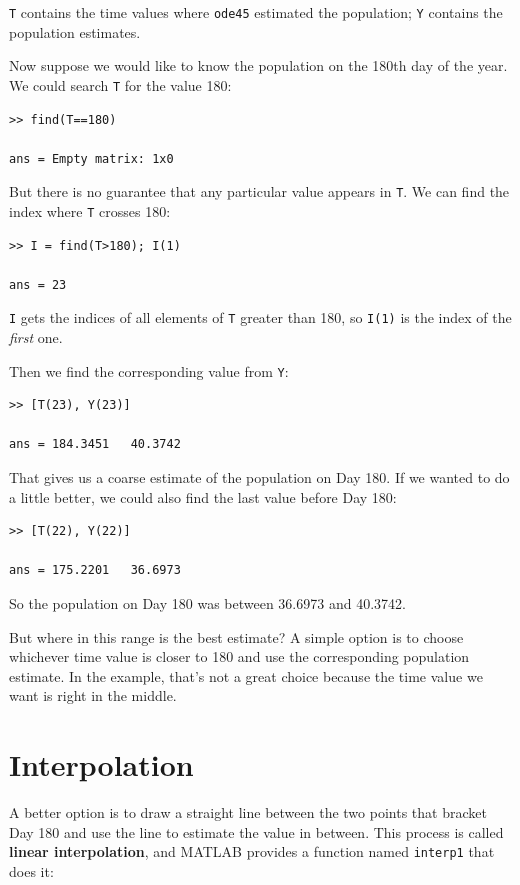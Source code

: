 \documentclass{book}
\begin{document}
{\tt T} contains the time values where {\tt ode45} estimated the
population; {\tt Y} contains the population estimates.

Now suppose we would like to know the population on the 180th day
of the year.  We could search {\tt T} for the value 180:

\begin{verbatim}
>> find(T==180)

ans = Empty matrix: 1x0
\end{verbatim}

But there is no guarantee that any particular value appears in
{\tt T}.  We can find the index where {\tt T} crosses 180:

\begin{verbatim}
>> I = find(T>180); I(1)

ans = 23
\end{verbatim}

{\tt I} gets the indices of all elements of {\tt T} greater
than 180, so {\tt I(1)} is the index of the {\em first} one.

Then we find the corresponding value from {\tt Y}:

\begin{verbatim}
>> [T(23), Y(23)]

ans = 184.3451   40.3742
\end{verbatim}

That gives us a coarse estimate of the population on Day 180.
If we wanted to do a little better, we could also find the last value
before Day 180:

\begin{verbatim}
>> [T(22), Y(22)]

ans = 175.2201   36.6973
\end{verbatim}

So the population on Day 180 was between 36.6973 and 40.3742.

But where in this range is the best estimate?  A simple option is to
choose whichever time value is closer to 180 and use the corresponding
population estimate.  In the example, that's not a great choice
because the time value we want is right in the middle.


\section{Interpolation}

A better option is to draw a straight line between the two points that
bracket Day 180 and use the line to estimate the value in between.
This process is called {\bf linear interpolation}, and MATLAB provides
a function named {\tt interp1} that does it:
\end{document}
